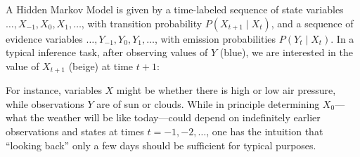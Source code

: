 \documentclass[10pt,letterpaper]{article}
\newcommand{\red}[1]{\textcolor{Red}{#1}}
\begin{document}
A Hidden Markov Model is given by a time-labeled sequence of state variables $\dots,X_{-1},X_{0},X_1,\dots$, %
with transition probability $P(X_{t+1}\mid X_t)$, and a sequence of evidence variables $\dots,Y_{-1},Y_0,Y_1,\dots$, with emission probabilities $P(Y_t\mid X_t)$. In a typical inference task, after observing  values of $Y$ (blue), we are interested in the value of $X_{t+1}$ (beige) at time $t+1$:

\begin{figure}[h] 
\begin{center}
\end{center} 
\end{figure} 
\noindent For instance, variables $X$ might be whether there is high or low air pressure, while observations $Y$ are of sun or clouds. While in principle determining $X_{0}$---what the weather will be like today---could depend on indefinitely earlier observations and states at times $t=-1,-2,\dots$, one has the intuition that ``looking back'' only a few days should be sufficient for typical purposes.
\end{document}

